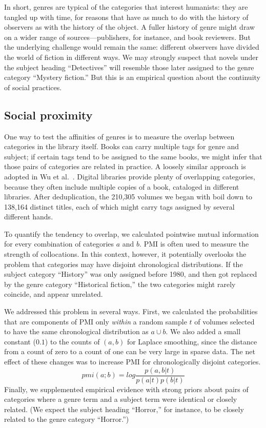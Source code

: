 \documentclass[11pt]{article}
\begin{document}
In short, genres are typical of the categories that interest humanists: they are tangled up with time, for reasons that have as much to do with the history of observers as with the history of the object. A fuller history of genre might draw on a wider range of sources---publishers, for instance, and book reviewers. But the underlying challenge would remain the same: different observers have divided the world of fiction in different ways.  We may strongly suspect that novels under the subject heading ``Detectives'' will resemble those later assigned to the genre category ``Mystery fiction.'' But this is an empirical question about the continuity of social practices.

\subsection{Social proximity}
One way to test the affinities of genres is to measure the overlap between categories in the library itself. Books can carry multiple tags for genre and subject; if certain tags tend to be assigned to the same books, we might infer that those pairs of categories are related in practice. A loosely similar approach is adopted in Wu et al.~. Digital libraries provide plenty of overlapping categories, because they often include multiple copies of a book, cataloged in different libraries. After deduplication, the 210,305 volumes we began with boil down to 138,164 distinct titles, each of which might carry tags assigned by several different hands.

To quantify the tendency to overlap, we calculated pointwise mutual information for every combination of categories $a$ and $b$. PMI is often used to measure the strength of collocations. In this context, however, it potentially overlooks the problem that categories may have disjoint chronological distributions. If the subject category ``History'' was only assigned before 1980, and then got replaced by the genre category ``Historical fiction,'' the two categories might rarely coincide, and appear unrelated. 

We addressed this problem in several ways. First, we calculated the probabilities that are components of PMI only \textit{within} a random sample $t$ of volumes selected to have the same chronological distribution as $a \cup b$. We also added a small constant ($0.1$) to the counts of $(a, b)$ for Laplace smoothing, since the distance from a count of zero to a count of one can be very large in sparse data. The net effect of these changes was to increase PMI for chronologically disjoint categories. 
\begin{equation}
pmi(a;b) = log\frac{p(a, b|t)}{p(a|t)p(b|t)}
\end{equation}
Finally, we supplemented empirical evidence with strong priors about pairs of categories where a genre term and a subject term were identical or closely related. (We expect the subject heading ``Horror,'' for instance, to be closely related to the genre category ``Horror.'')
\end{document}
